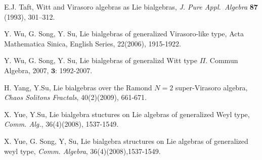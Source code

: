 \documentclass{amsart}
\theoremstyle{definition}
\theoremstyle{remark}
\numberwithin{equation}{subsection}
\numberwithin{equation}{section}
\begin{document}
\begin{thebibliography}{99}
 E.J. Taft, Witt and Virasoro algebras as Lie bialgebras,
{\it J. Pure Appl.~Algebra} {\bf87} (1993), 301--312.

 Y. Wu, G. Song, Y. Su, Lie bialgebras of generalized
Virasoro-like type, Acta Mathematica Sinica, English Series,
22(2006), 1915-1922.

 Y. Wu, G. Song, Y. Su, Lie bialgebras of generalizd Witt
type $\Pi$. Commun Algebra, 2007, $\textbf{3}$: 1992-2007.

 H. Yang, Y.Su, Lie bialgebras over
the Ramond $N=2$ super-Virasoro algebra, {\it Chaos Solitons
Fractals}, 40(2)(2009), 661-671.

 X. Yue, Y.Su, Lie bialgebra stuctures on Lie algebras of
generalized Weyl type, {\it Comm. Alg.}, 36(4)(2008), 1537-1549.

 X. Yue, G. Song, Y, Su, Lie bialgebra structures on Lie
algebras of generalized weyl type, {\it Comm. Algebra},
36(4)(2008),1537-1549.

\end{thebibliography}
\end{document}
